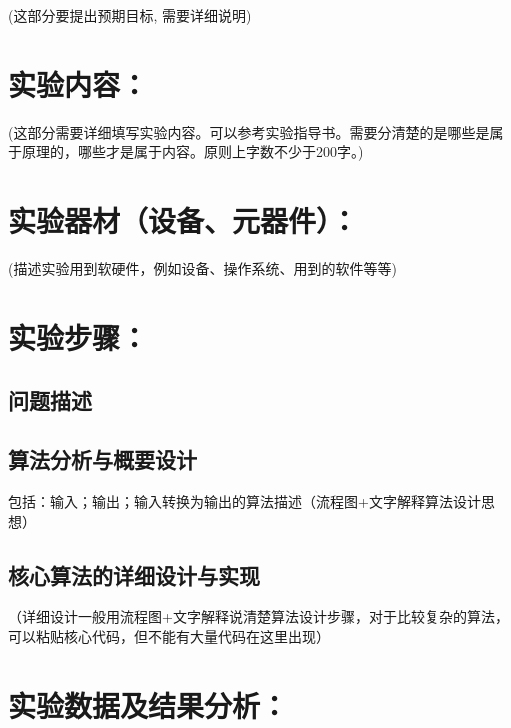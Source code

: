 \documentclass[a4paper,11pt,UTF8,AutoFakeBold]{ctexart}
\begin{document}
(这部分要提出预期目标, 需要详细说明)\\

\section{实验内容：}

(这部分需要详细填写实验内容。可以参考实验指导书。需要分清楚的是哪些是属于原理的，哪些才是属于内容。原则上字数不少于200字。)\\

\section{实验器材（设备、元器件）：}

(描述实验用到软硬件，例如设备、操作系统、用到的软件等等)\\

\section{实验步骤：}

\subsection{问题描述}
\subsection{算法分析与概要设计}
包括：输入；输出；输入转换为输出的算法描述（流程图+文字解释算法设计思想）
\subsection{核心算法的详细设计与实现}
（详细设计一般用流程图+文字解释说清楚算法设计步骤，对于比较复杂的算法，可以粘贴核心代码，但不能有大量代码在这里出现）


\section{实验数据及结果分析：}
\end{document}
